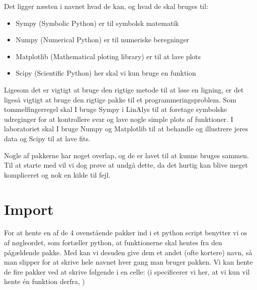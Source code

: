 \documentclass[letterpaper,10pt,english]{jupyterBook}
\begin{document}
Det ligger næsten i navnet hvad de kan, og hvad de skal bruges til:
\begin{itemize}
\item {} 
Sympy (Symbolic Python) er til symbolsk matematik

\item {} 
Numpy (Numerical Python) er til numeriske beregninger

\item {} 
Matplotlib (Mathematical ploting library) er til at lave plots

\item {} 
Scipy (Scientific Python) her skal vi kun bruge en funktion

\end{itemize}

Ligesom det er vigtigt at bruge den rigtige metode til at løse en ligning, er det ligeså vigtigt at bruge den rigtige pakke til et programmeringsproblem. Som tommelfingerregel skal I bruge Sympy i LinAlys til at foretage symbolske udreginger for at kontrollere svar og lave nogle simple plots af funktioner. I laboratoriet skal I bruge Numpy og Matplotlib til at behandle og illustrere jeres data og Scipy til at lave fits.

Nogle af pakkerne har noget overlap, og de er lavet til at kunne bruges sammen. Til at starte med vil vi dog prøve at undgå dette, da det hurtig kan blive meget kompliceret og nok en kilde til fejl.


\section{Import}
\label{\detokenize{notebooks/Intro_til_pakker:import}}
For at hente en af de 4 ovenstående pakker ind i et python script benytter vi os af  nøgleordet, som fortæller python, at funktionerne skal hentes fra den pågældende pakke. Med  kan vi desuden give dem et andet (ofte kortere) navn, så man slipper for at skrive hele navnet hver gang man bruger pakken. Vi kan hente de fire pakker ved at skrive følgende i en celle: (i  specificerer vi her, at vi kun vil hente én funktion derfra, )

\begin{sphinxVerbatim}[commandchars=\\\{\}]
   
   
   
   
\end{sphinxVerbatim}
\end{document}
